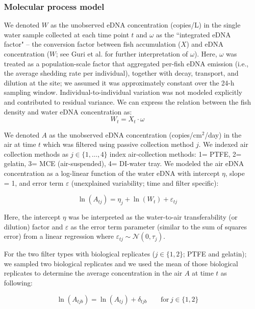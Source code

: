 \documentclass{article}
\begin{document}
\subsubsection{Molecular process model}
We denoted $W$ as the unobserved eDNA concentration (copies/L) in the single water sample collected at each time point $t$ and $\omega$ as the ``integrated eDNA factor" -- the conversion factor between fish accumulation ($X$) and eDNA concentration ($W$; see Guri et al. \cite{guri2024a} for further interpretation of $\omega$). Here, $\omega$ was treated as a population-scale factor that aggregated per-fish eDNA emission (i.e., the average shedding rate per individual), together with decay, transport, and dilution at the site; we assumed it was approximately constant over the 24-h sampling window. Individual-to-individual variation was not modeled explicitly and contributed to residual variance. We can express the relation between the fish density and water eDNA concentration as:
\begin{equation}
W_{t} = X_{t} \cdot \omega
\end{equation}

We denoted $A$ as the unobserved eDNA concentration (copies/cm$^2$/day) in the air at time $t$ which was filtered using passive collection method $j$. We indexed air collection methods as $j \in \{1, \dots, 4\}$ index air-collection methods: 1= PTFE, 2= gelatin, 3= MCE (air-suspended), 4= DI-water tray. We modeled the air eDNA concentration as a log-linear function of the water eDNA with intercept $\eta$, slope = 1, and error term $\varepsilon$ (unexplained variability; time and filter specific):

\begin{equation}
\ln(A_{tj}) = \eta_{j} + \ln(W_{t}) + \varepsilon_{tj}
\end{equation}

Here, the intercept $\eta$ was be interpreted as the water-to-air transferability (or dilution) factor and $\varepsilon$  as the error term parameter (similar to the sum of squares error) from a linear regression where $\varepsilon_{tj} \sim \mathcal{N}(0,\tau_j)$.

For the two filter types with biological replicates ($j \in \{1,2\}$; PTFE and gelatin); we sampled two biological replicates and we used the mean of those biological replicates to determine the average concentration in the air $A$ at time $t$ as following:

\begin{equation}
\ln(A_{tjb}) = \ln(A_{tj}) + \delta_{tjb} \qquad \text{for} \ j \in \{1,2\}
\end{equation}
\end{document}
